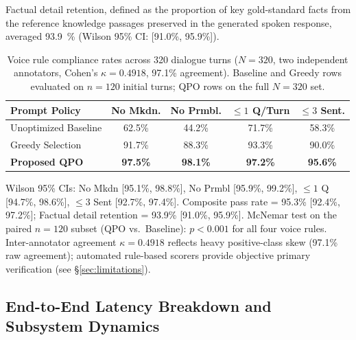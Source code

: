 \documentclass[review,12pt,times,authoryear]{elsarticle}
\theoremstyle{definition}
\begin{document}
Factual detail retention, defined as the proportion of key gold-standard facts from the reference knowledge passages preserved in the generated spoken response, averaged \SI{93.9}{\percent} (Wilson 95\% CI: [91.0\%, 95.9\%]).

\begin{table}[t]
\centering
\small
\setlength{\tabcolsep}{3.5pt}
\renewcommand{\arraystretch}{1.12}
\caption{Voice rule compliance rates across 320 dialogue turns ($N=320$, two independent annotators, Cohen's $\kappa=0.4918$, 97.1\% agreement). Baseline and Greedy rows evaluated on $n=120$ initial turns; QPO rows on the full $N=320$ set.}
\label{tab:compliance}
\begin{tabularx}{\columnwidth}{@{}Xcccc@{}}
\toprule
\textbf{Prompt Policy} & \textbf{No Mkdn.} & \textbf{No Prmbl.} & \textbf{$\le 1$ Q/Turn} & \textbf{$\le 3$ Sent.} \\
\midrule
Unoptimized Baseline  & 62.5\% & 44.2\% & 71.7\% & 58.3\% \\
Greedy Selection      & 91.7\% & 88.3\% & 93.3\% & 90.0\% \\
\textbf{Proposed QPO} & \textbf{97.5\%} & \textbf{98.1\%} & \textbf{97.2\%} & \textbf{95.6\%} \\
\bottomrule
\end{tabularx}
\vspace{2pt}\par\raggedright\footnotesize{Wilson 95\% CIs: No Mkdn [95.1\%, 98.8\%], No Prmbl [95.9\%, 99.2\%], $\le 1$ Q [94.7\%, 98.6\%], $\le 3$ Sent [92.7\%, 97.4\%]. Composite pass rate = 95.3\% [92.4\%, 97.2\%]; Factual detail retention = 93.9\% [91.0\%, 95.9\%]. McNemar test on the paired $n=120$ subset (QPO vs.\ Baseline): $p < 0.001$ for all four voice rules. Inter-annotator agreement $\kappa=0.4918$ reflects heavy positive-class skew (97.1\% raw agreement); automated rule-based scorers provide objective primary verification (see \S\ref{sec:limitations}).}
\end{table}

\subsection{End-to-End Latency Breakdown and Subsystem Dynamics}
\end{document}
